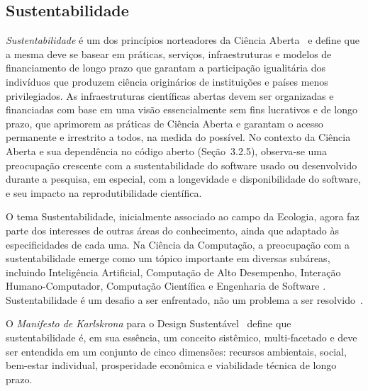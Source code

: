 \subsection{Sustentabilidade}
\label{subsection:srs}


\textit{Sustentabilidade} é um dos princípios norteadores da Ciência Aberta~\cite{unesco:2021} e define que a mesma
deve se basear em práticas, serviços, infraestruturas e modelos de financiamento de longo prazo que garantam a participação igualitária dos indivíduos que produzem ciência originários de instituições e países menos privilegiados. 
As infraestruturas científicas abertas devem ser organizadas e financiadas com base em uma visão essencialmente sem fins lucrativos e de longo prazo, que aprimorem as práticas de Ciência Aberta e garantam o acesso permanente e irrestrito a todos, na medida do possível.
%
No contexto da Ciência Aberta e sua dependência 
no código aberto (Seção~3.2.5), observa-se uma preocupação crescente com a sustentabilidade do software usado ou desenvolvido durante a pesquisa, em especial, com a longevidade e disponibilidade do software, e seu impacto na reprodutibilidade científica.
%


O tema Sustentabilidade, inicialmente associado ao campo da Ecologia, agora faz parte dos interesses de outras áreas do conhecimento, ainda que adaptado às especificidades de cada uma. 
Na Ciência da Computação, a preocupação com a sustentabilidade emerge como um tópico importante em diversas subáreas, incluindo Inteligência Artificial, Computação de Alto Desempenho, Interação Humano-Computador, Computação Científica e Engenharia de Software \cite{venters_software_2021}.
Sustentabilidade é um desafio a ser enfrentado, não um problema a ser resolvido~\cite{becker_2014}.

O \textit{Manifesto de Karlskrona} para o Design Sustentável~\cite{becker_2014}
define que sustentabilidade é, em sua essência, um conceito sistêmico, multi-facetado e deve ser entendida em um conjunto de cinco dimensões:
recursos ambientais, social, bem-estar individual, prosperidade econômica e viabilidade técnica de longo prazo.

